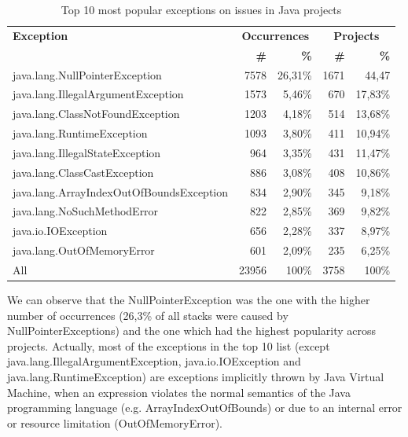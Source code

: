 \documentclass[conference]{IEEEtran}
\begin{document}
\begin{table}
\begin{tabular}{lrrrr}
    \hline
    \bfseries{Exception} &  \multicolumn{2}{c}{\bfseries{Occurrences}} &  \multicolumn{2}{c}{\bfseries{Projects}}\\
    & \bfseries{\#} &  \bfseries{\%} & \bfseries{\# } & \bfseries{\% } \\
    \hline
java.lang.NullPointerException             & 7578 & 26,31\% & 1671 & 44,47 \\
java.lang.IllegalArgumentException         & 1573 & 5,46\%  & 670  & 17,83\% \\
java.lang.ClassNotFoundException           & 1203 & 4,18\%  & 514  & 13,68\% \\
java.lang.RuntimeException                 & 1093 & 3,80\%  & 411  & 10,94\% \\
java.lang.IllegalStateException            & 964  & 3,35\%  & 431  & 11,47\% \\
java.lang.ClassCastException               & 886  & 3,08\%  & 408  & 10,86\% \\
java.lang.ArrayIndexOutOfBoundsException   & 834  & 2,90\%  & 345  & 9,18\% \\
java.lang.NoSuchMethodError                & 822  & 2,85\%  & 369  & 9,82\% \\
java.io.IOException                        & 656  & 2,28\%  & 337  & 8,97\% \\
java.lang.OutOfMemoryError                 & 601  & 2,09\%  & 235  & 6,25\% \\
\hline
All	 &	23956 &	100\%	& 3758 & 100\%	 \\
\hline
  \end{tabular}
\caption{Top 10 most popular exceptions on issues in Java projects}
\label{tab:toptenjava}
\end{table}

We can observe that the NullPointerException was the one with the higher number
of occurrences (26,3\% of all stacks were caused by NullPointerExceptions) and
the one which had the highest popularity across projects. Actually, most of the
exceptions in the top 10 list (except java.lang.IllegalArgumentException,
java.io.IOException and java.lang.RuntimeException) are exceptions implicitly
thrown by Java Virtual Machine, when an expression violates the normal
semantics of the Java programming language (e.g. ArrayIndexOutOfBounds) or due
to an internal error or resource limitation (OutOfMemoryError).
\end{document}
